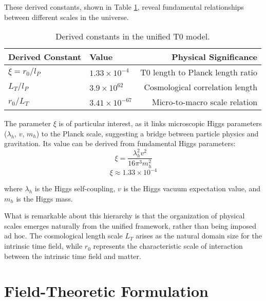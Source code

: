\documentclass[12pt,a4paper]{article} %
\begin{document}
	These derived constants, shown in Table \ref{tab:derived_constants},
	reveal fundamental relationships between different scales in the universe.
	
	\begin{table}[ht]
		\centering
		\caption{Derived constants in the unified T0 model.}
		\label{tab:derived_constants}
		\begin{tabular}{llr} %
			\hline
			\textbf{Derived Constant} & \textbf{Value} & \textbf{Physical Significance} \\
			\hline
			$\xi = r_0/l_P$ & $1.33 \times 10^{-4}$ & T0 length to Planck length ratio \\
			$L_T/l_P$ & $3.9 \times 10^{62}$ & Cosmological correlation length \\
			$r_0/L_T$ & $3.41 \times 10^{-67}$ & Micro-to-macro scale relation \\
			\hline
		\end{tabular}
	\end{table}
	
	The parameter $\xi$ is of particular interest,
	as it links microscopic Higgs parameters ($\lambda_h$, $v$, $m_h$) to the Planck scale,
	suggesting a bridge between particle physics and gravitation. 
	Its value can be derived from fundamental Higgs parameters:
	\begin{equation}
		\xi = \frac{\lambda_h^2 v^2}{16\pi^3 m_h^2}
		\label{eq:xi_value_part1}
	\end{equation}
	\begin{equation}
		\xi \approx 1.33 \times 10^{-4}
		\label{eq:xi_value_part2}
	\end{equation}
	
	where $\lambda_h$ is the Higgs self-coupling,
	$v$ is the Higgs vacuum expectation value,
	and $m_h$ is the Higgs mass.
	
	What is remarkable about this hierarchy
	is that the organization of physical scales emerges naturally from the unified framework,
	rather than being imposed ad hoc. 
	The cosmological length scale $L_T$ arises as the natural domain size
	for the intrinsic time field,
	while $r_0$ represents the characteristic scale of interaction
	between the intrinsic time field and matter.
	
	\section{Field-Theoretic Formulation}
	\label{sec:field_theory}
	
\end{document}
